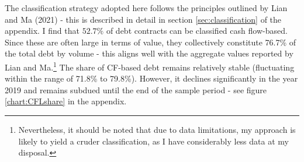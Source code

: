 \documentclass[12pt]{article}
\begin{document}
\begin{table}[H]
    \centering
    \caption{\small Summary Statistics - debt contracts between 2010Q1 and 2023Q2}
    \label{tab:sumstat}
\end{table}

\noindent The classification strategy adopted here follows the principles outlined by Lian and Ma (2021) - this is described in detail in section \ref{sec:classification} of the appendix.  I find that $52.7\%$ of debt contracts can be classified cash flow-based. Since these are often large in terms of value, they collectively constitute 76.7\% of the total debt by volume - this aligns well with the aggregate values reported by Lian and Ma.\footnote{Nevertheless, it should be noted that due to data limitations, my approach is likely to yield a cruder classification, as I have considerably less data at my disposal.} The share of CF-based debt remains relatively stable (fluctuating within the range of 71.8\% to 79.8\%). However, it declines significantly in the year 2019 and remains subdued until the end of the sample period - see figure \ref{chart:CFLshare} in the appendix. 
\end{document}
